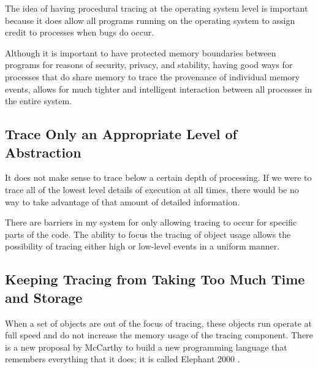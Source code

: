The idea of having procedural tracing at the operating system level is
important because it does allow all programs running on the operating
system to assign credit to processes when bugs do occur.


Although it is important to have protected memory boundaries between
programs for reasons of security, privacy, and stability, having good
ways for processes that do share memory to trace the provenance of
individual memory events, allows for much tighter and intelligent
interaction between all processes in the entire system.
        

\subsection{Trace Only an Appropriate Level of Abstraction}

It does not make sense to trace below a certain depth of processing.
If we were to trace all of the lowest level details of execution at
all times, there would be no way to take advantage of that amount
of detailed information.

There are barriers in my system for only allowing tracing to occur for
specific parts of the code.  The ability to focus the tracing of object
usage allows the possibility of tracing either high or low-level events
in a uniform manner.

\subsection{Keeping Tracing from Taking Too Much Time and Storage}

When a set of objects are out of the focus of tracing, these objects run
operate at full speed and do not increase the memory usage of the
tracing component.  There is a new proposal by McCarthy to build a new
programming language that remembers everything that it does; it is
called Elephant 2000 \citep{mccarthy:1994}.

